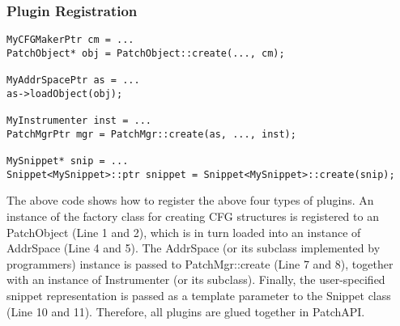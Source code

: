 \subsubsection{Plugin Registration}
\lstset{numbers=left}
\begin{lstlisting}
MyCFGMakerPtr cm = ...
PatchObject* obj = PatchObject::create(..., cm);

MyAddrSpacePtr as = ...
as->loadObject(obj);

MyInstrumenter inst = ...
PatchMgrPtr mgr = PatchMgr::create(as, ..., inst);

MySnippet* snip = ...
Snippet<MySnippet>::ptr snippet = Snippet<MySnippet>::create(snip);
\end{lstlisting}
The above code shows how to register the above four types of plugins.  An
instance of the factory class for creating CFG structures is registered to an
PatchObject (Line 1 and 2), which is in turn loaded into an instance of
AddrSpace (Line 4 and 5). The AddrSpace (or its subclass implemented by
programmers) instance is passed to PatchMgr::create (Line 7 and 8), together
with an instance of Instrumenter (or its subclass). Finally, the user-specified
snippet representation is passed as a template parameter to the Snippet
class (Line 10 and 11). Therefore, all plugins are glued together in PatchAPI.
